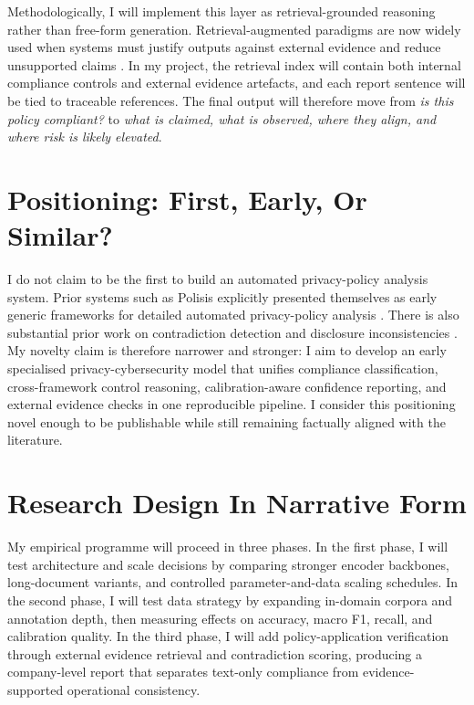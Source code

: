 \documentclass[12pt]{article}
\begin{document}
Methodologically, I will implement this layer as retrieval-grounded reasoning rather than free-form generation. Retrieval-augmented paradigms are now widely used when systems must justify outputs against external evidence and reduce unsupported claims \citep{lewis2020rag}. In my project, the retrieval index will contain both internal compliance controls and external evidence artefacts, and each report sentence will be tied to traceable references. The final output will therefore move from \emph{is this policy compliant?} to \emph{what is claimed, what is observed, where they align, and where risk is likely elevated}.

\section{Positioning: First, Early, Or Similar?}
I do not claim to be the first to build an automated privacy-policy analysis system. Prior systems such as Polisis explicitly presented themselves as early generic frameworks for detailed automated privacy-policy analysis \citep{harkous2018polisis}. There is also substantial prior work on contradiction detection and disclosure inconsistencies \citep{andow2019policylint,okoyomon2019notice}. My novelty claim is therefore narrower and stronger: I aim to develop an early specialised privacy-cybersecurity model that unifies compliance classification, cross-framework control reasoning, calibration-aware confidence reporting, and external evidence checks in one reproducible pipeline. I consider this positioning novel enough to be publishable while still remaining factually aligned with the literature.

\section{Research Design In Narrative Form}
My empirical programme will proceed in three phases. In the first phase, I will test architecture and scale decisions by comparing stronger encoder backbones, long-document variants, and controlled parameter-and-data scaling schedules. In the second phase, I will test data strategy by expanding in-domain corpora and annotation depth, then measuring effects on accuracy, macro F1, recall, and calibration quality. In the third phase, I will add policy-application verification through external evidence retrieval and contradiction scoring, producing a company-level report that separates text-only compliance from evidence-supported operational consistency.
\end{document}

